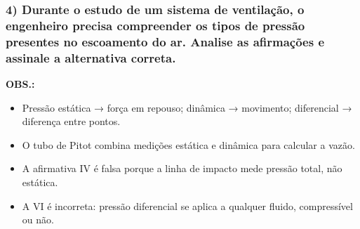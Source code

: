 \documentclass[12pt]{beamer}
\begin{document}
\begin{frame}
\frametitle{4) Durante o estudo de um sistema de ventilação, o engenheiro precisa compreender os tipos de pressão presentes no escoamento do ar. Analise as afirmações e assinale a alternativa correta.}
{\BodySize
\textbf{OBS.:}
\begin{itemize}
\item Pressão estática → força em repouso; dinâmica → movimento; diferencial → diferença entre pontos.
\item O tubo de Pitot combina medições estática e dinâmica para calcular a vazão.
\item A afirmativa IV é falsa porque a linha de impacto mede pressão total, não estática.
\item A VI é incorreta: pressão diferencial se aplica a qualquer fluido, compressível ou não.
\end{itemize}
}
\end{frame}
\end{document}

